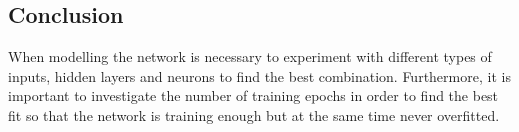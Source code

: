 \subsection{Conclusion}
When modelling the network is necessary to experiment with different types of inputs, hidden layers and neurons to find the best combination. Furthermore, it is important to investigate the number of training epochs in order to find the best fit so that the network is training enough but at the same time never overfitted. 